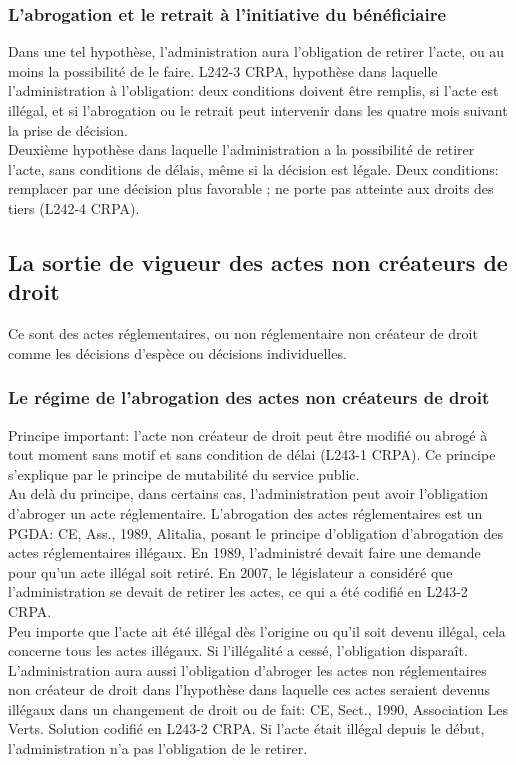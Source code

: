 \documentclass[10pt, a4paper, openany]{book}
\begin{document}
\subsubsection{L'abrogation et le retrait à l'initiative du bénéficiaire}

Dans une tel hypothèse, l'administration aura l'obligation de retirer l'acte, ou au moins la possibilité de le faire.
L242-3 CRPA, hypothèse dans laquelle l'administration à l'obligation: deux conditions doivent être remplis, si l'acte est illégal, et si l'abrogation ou le retrait peut intervenir dans les quatre mois suivant la prise de décision. \\
Deuxième hypothèse dans laquelle l'administration a la possibilité de retirer l'acte, sans conditions de délais, même si la décision est légale. Deux conditions: remplacer par une décision plus favorable ; ne porte pas atteinte aux droits des tiers (L242-4 CRPA). 

\subsection{La sortie de vigueur des actes non créateurs de droit}

Ce sont des actes réglementaires, ou non réglementaire non créateur de droit comme les décisions d'espèce ou décisions individuelles. 

\subsubsection{Le régime de l'abrogation des actes non créateurs de droit}

Principe important: l'acte non créateur de droit peut être modifié ou abrogé à tout moment sans motif et sans condition de délai (L243-1 CRPA). Ce principe s'explique par le principe de mutabilité du service public. \\
Au delà du principe, dans certains cas, l'administration peut avoir l'obligation d'abroger un acte réglementaire. L'abrogation des actes réglementaires est un PGDA: CE, Ass., 1989, Alitalia, posant le principe d'obligation d'abrogation des actes réglementaires illégaux. En 1989, l'administré devait faire une demande pour qu'un acte illégal soit retiré. En 2007, le législateur a considéré que l'administration se devait de retirer les actes, ce qui a été codifié en L243-2 CRPA. \\
Peu importe que l'acte ait été illégal dès l'origine ou qu'il soit devenu illégal, cela concerne tous les actes illégaux. Si l'illégalité a cessé, l'obligation disparaît. \\
L'administration aura aussi l'obligation d'abroger les actes non réglementaires non créateur de droit dans l'hypothèse dans laquelle ces actes seraient devenus illégaux dans un changement de droit ou de fait: CE, Sect., 1990, Association Les Verts. Solution codifié en L243-2 CRPA. Si l'acte était illégal depuis le début, l'administration n'a pas l'obligation de le retirer.
\end{document}
